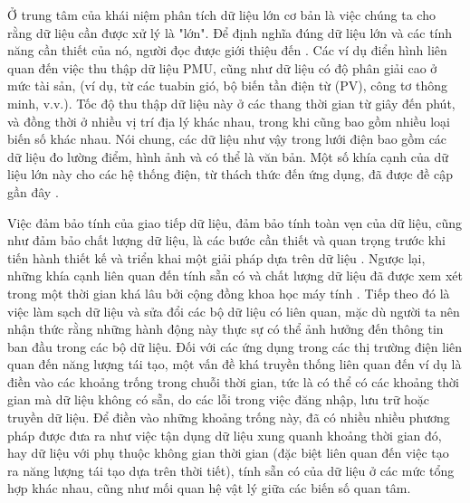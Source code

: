 \documentclass[utf8]{frontiersSCNS} %
\begin{document}
Ở trung tâm của khái niệm phân tích dữ liệu lớn cơ bản là việc chúng ta cho rằng dữ liệu cần được xử lý là "lớn". Để định nghĩa đúng dữ liệu lớn và các tính năng cần thiết của nó, người đọc được giới thiệu đến \citep{DeMauro2016}. Các ví dụ điển hình liên quan đến việc thu thập dữ liệu PMU, cũng như dữ liệu có độ phân giải cao ở mức tài sản, (ví dụ, từ các tuabin gió, bộ biến tần điện từ (PV), công tơ thông minh, v.v.). Tốc độ thu thập dữ liệu này ở các thang thời gian từ giây đến phút, và đồng thời ở nhiều vị trí địa lý khác nhau, trong khi cũng bao gồm nhiều loại biến số khác nhau. Nói chung, các dữ liệu như vậy trong lưới điện bao gồm các dữ liệu đo lường điểm, hình ảnh và có thể là văn bản. Một số khía cạnh của dữ liệu lớn này cho các hệ thống điện, từ thách thức đến ứng dụng, đã được \cite{Arghandeh2017} đề cập gần đây .

Việc đảm bảo tính của giao tiếp dữ liệu, đảm bảo tính toàn vẹn của dữ liệu, cũng như đảm bảo chất lượng dữ liệu, là các bước cần thiết và quan trọng trước khi tiến hành thiết kế và triển khai một giải pháp dựa trên dữ liệu \citep{Cai2015}. Ngược lại, những khía cạnh liên quan đến tính sẵn có và chất lượng dữ liệu đã được xem xét trong một thời gian khá lâu bởi cộng đồng khoa học máy tính \citep{Batini2009}. Tiếp theo đó là việc làm sạch dữ liệu và sửa đổi các bộ dữ liệu có liên quan, mặc dù người ta nên nhận thức rằng những hành động này thực sự có thể ảnh hưởng đến thông tin ban đầu trong các bộ dữ liệu. Đối với các ứng dụng trong các thị trường điện liên quan đến năng lượng tái tạo, một vấn đề khá truyền thống liên quan đến ví dụ là điền vào các khoảng trống trong chuỗi thời gian, tức là có thể có các khoảng thời gian mà dữ liệu không có sẵn, do các lỗi trong việc đăng nhập, lưu trữ hoặc truyền dữ liệu. Để điền vào những khoảng trống này, đã có nhiều nhiều phương pháp được đưa ra như việc  tận dụng dữ liệu xung quanh khoảng thời gian đó, hay dữ liệu với phụ thuộc không gian thời gian (đặc biệt liên quan đến việc tạo ra năng lượng tái tạo dựa trên thời tiết), tính sẵn có của dữ liệu ở các mức tổng hợp khác nhau, cũng như mối quan hệ vật lý giữa các biến số quan tâm.
\end{document}
